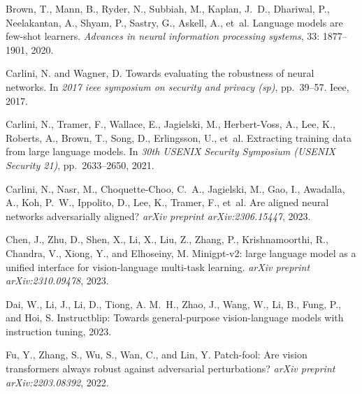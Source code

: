 \begin{thebibliography}{39}
Brown, T., Mann, B., Ryder, N., Subbiah, M., Kaplan, J.~D., Dhariwal, P., Neelakantan, A., Shyam, P., Sastry, G., Askell, A., et~al.
\newblock Language models are few-shot learners.
\newblock \emph{Advances in neural information processing systems}, 33: 1877--1901, 2020.

Carlini, N. and Wagner, D.
\newblock Towards evaluating the robustness of neural networks.
\newblock In \emph{2017 ieee symposium on security and privacy (sp)}, pp.\  39--57. Ieee, 2017.

Carlini, N., Tramer, F., Wallace, E., Jagielski, M., Herbert-Voss, A., Lee, K., Roberts, A., Brown, T., Song, D., Erlingsson, U., et~al.
\newblock Extracting training data from large language models.
\newblock In \emph{30th USENIX Security Symposium (USENIX Security 21)}, pp.\  2633--2650, 2021.

Carlini, N., Nasr, M., Choquette-Choo, C.~A., Jagielski, M., Gao, I., Awadalla, A., Koh, P.~W., Ippolito, D., Lee, K., Tramer, F., et~al.
\newblock Are aligned neural networks adversarially aligned?
\newblock \emph{arXiv preprint arXiv:2306.15447}, 2023.

Chen, J., Zhu, D., Shen, X., Li, X., Liu, Z., Zhang, P., Krishnamoorthi, R., Chandra, V., Xiong, Y., and Elhoseiny, M.
\newblock Minigpt-v2: large language model as a unified interface for vision-language multi-task learning.
\newblock \emph{arXiv preprint arXiv:2310.09478}, 2023.

Dai, W., Li, J., Li, D., Tiong, A. M.~H., Zhao, J., Wang, W., Li, B., Fung, P., and Hoi, S.
\newblock Instructblip: Towards general-purpose vision-language models with instruction tuning, 2023.

Fu, Y., Zhang, S., Wu, S., Wan, C., and Lin, Y.
\newblock Patch-fool: Are vision transformers always robust against adversarial perturbations?
\newblock \emph{arXiv preprint arXiv:2203.08392}, 2022.


\end{thebibliography}
